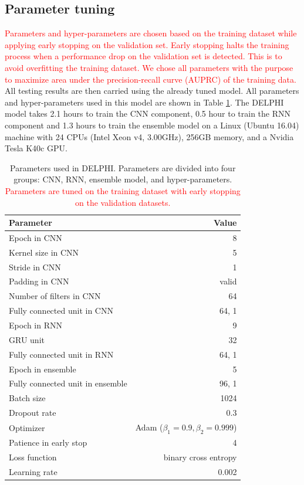 \documentclass{bioinfo}
\newcommand{\myColor}{red}
\begin{document}
\begin{methods}
\subsection{Parameter tuning}
\textcolor{\myColor}{
Parameters and hyper-parameters are chosen based on the training dataset while applying early stopping \citep{prechelt1998early} on the validation set. Early stopping halts the training process when a performance drop on the validation set is detected. This is to avoid overfitting the training dataset. We chose all parameters with the purpose to maximize area under the precision-recall curve (AUPRC) of the training data.} All testing results are then carried using the already tuned model. All parameters and hyper-parameters used in this model are shown in Table \ref{tab_parameter}. 
The DELPHI model takes 2.1 hours to train the CNN component, 0.5 hour to train the RNN component and 1.3 hours to train the ensemble model on a Linux (Ubuntu 16.04) machine with 24 CPUs (Intel Xeon v4, 3.00GHz), 256GB memory, and a Nvidia Tesla K40c GPU.

\begin{table}[H]
  \centering
  \caption{Parameters used in DELPHI. Parameters are divided into four groups: CNN, RNN, ensemble model, and hyper-parameters. \textcolor{\myColor}{Parameters are tuned on the training dataset with early stopping on the validation datasets.}}
    \begin{tabular}{@{}p{4.4cm}r@{}}
    \toprule
    Parameter & Value \\
    \midrule
    Epoch in CNN & 8 \\
    Kernel size in CNN & 5 \\
    Stride in CNN & 1 \\
    Padding in CNN & valid \\
    Number of filters in CNN & 64 \\
    Fully connected unit in CNN & 64, 1 \\
    \hline
    Epoch in RNN & 9 \\
    GRU unit & 32 \\
    Fully connected unit in RNN & 64, 1 \\
    \hline
    Epoch in ensemble & 5 \\
    Fully connected unit in ensemble & 96, 1 \\
    \hline
    Batch size & 1024 \\
    Dropout rate & 0.3 \\
    Optimizer & Adam ($\beta_1=0.9, \beta_2=0.999$) \\
    Patience in early stop & 4 \\
    Loss function & binary cross entropy \\
    Learning rate & 0.002 \\
    \bottomrule
    \end{tabular}%
  \label{tab_parameter}%
\end{table}%

\end{methods}
\end{document}

